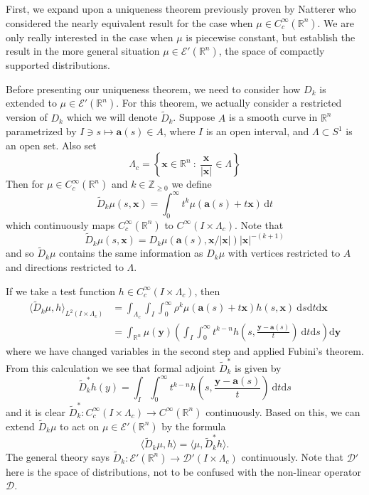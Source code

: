 \documentclass[a4paper,12pt]{amsart}
\numberwithin{equation}{section}
\theoremstyle{plain}
\numberwithin{theorem}{section}
\theoremstyle{definition}
\theoremstyle{remark}
\theoremstyle{remark}
\theoremstyle{remark}
\renewcommand{\d}{\,\mathrm{d}}  %
\newcommand{\tred}[1]{{\color{red}#1}}
\newcommand{\va}{\mathbf{a}}
\newcommand{\vx}{{\mathbf{x}}}
\newcommand{\vy}{{\mathbf{y}}}
\newcommand{\jc}[1]{\begin{quotation}\textbf{James' comment:\
}{\textit{#1}}\end{quotation}}
\newcommand{\seanc}[1]{\begin{quotation}\textbf{Sean's comment:\
}{\textit{#1}}\end{quotation}}
\begin{document}
{First, we expand upon a uniqueness theorem previously proven by Natterer \cite[Theorem 3.3, chapter 2]{natterer} who considered the nearly equivalent result for the case when $\mu \in C_c^\infty(\mathbb{R}^n)$. We are only really interested in the case when $\mu$ is piecewise constant, but establish the result in the more general situation $\mu \in \mathcal{E}'(\mathbb{R}^n)$, the space of compactly supported distributions.

Before presenting our uniqueness theorem, we need to consider how $D_k$ is extended to $\mu\in \mathcal{E}'(\mathbb{R}^n)$. 
For this theorem, we actually consider a restricted version of $D_k$ which we will denote $\widetilde{D}_k$. 
Suppose $A$ is a smooth curve in $\mathbb{R}^n$ parametrized by $I \ni s \mapsto \va(s) \in A$, where $I$ is an open interval, and $\Lambda \subset S^1$ is an open set. Also set
\[
\Lambda_c = \left \{ \vx \in \mathbb{R}^n \ : \ \frac{\vx}{|\vx|} \in \Lambda \right \}
\]
Then for $\mu \in C_c^\infty(\mathbb{R}^n)$ and $k \in \mathbb{Z}_{\geq 0}$ we define
\begin{equation}
    \widetilde{D}_k \mu(s,\vx) = \int_0^\infty t^{k} \mu(\va(s) + t \vx) \d t
\end{equation}
which continuously maps $C_c^\infty(\mathbb{R}^n)$ to $C^\infty(I \times \Lambda_c)$. Note that
\[
\widetilde{D}_k \mu(s,\vx) = D_k\mu(\va(s),\vx/|\vx|) |\vx|^{-(k+1)}
\]
and so $\widetilde{D}_k \mu$ contains the same information as $D_k \mu$ with vertices restricted to $A$ and directions restricted to $\Lambda$. 

If we take a test function $h \in C_c^\infty(I\times \Lambda_c)$, then
\begin{equation}\label{eq:Dkdef2}
\begin{split}
\langle \widetilde{D}_k \mu, h \rangle_{L^2(I \times \Lambda_c)} & = \int_{\Lambda_c} \int_I \int_0^\infty \rho^{k} \mu(\va(s) + t \vx) h(s,\vx) \ \mathrm{d}s \mathrm{d}t \mathrm{d}\vx \\
& = \int_{\mathbb{R}^n} \mu(\vy)\left ( \int_I \int_0^\infty t^{k-n} h\left ( s, \frac{\vy-\va(s)}{t} \right )\ \mathrm{d}t \mathrm{d}s\right ) \mathrm{d}\vy
\end{split}
\end{equation}
where we have changed variables in the second step and applied Fubini's theorem. From this calculation we see that formal adjoint $\widetilde{D}_k^*$ is given by
\[
\widetilde{D}_k^* h(y) =  \int_I \int_0^\infty t^{k-n} h\left ( s, \frac{\vy-\va(s)}{t} \right )\ \mathrm{d}t \mathrm{d}s
\]
and it is clear $\widetilde{D}_k^* : C_c^\infty(I \times \Lambda_c) \rightarrow C^\infty(\mathbb{R}^n)$ continuously. Based on this, we can extend $\widetilde{D}_k\mu$ to act on $\mu \in \mathcal{E}'(\mathbb{R}^n)$ by the formula
\[
\langle \widetilde{D}_k \mu, h \rangle = \langle \mu, \widetilde{D}_k^* h \rangle.
\]
The general theory says $\widetilde{D}_k :  \mathcal{E}'(\mathbb{R}^n) \rightarrow \mathcal{D}'(I \times \Lambda_c)$ continuously. Note that $\mathcal{D}'$ here is the space of distributions, not to be confused with the non-linear operator $\mathcal{D}$.

}
\end{document}
